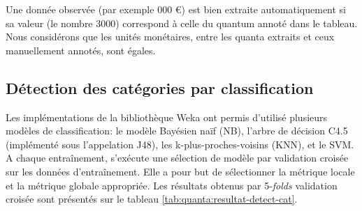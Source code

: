 Une donnée observée (par exemple  000 \euro \fg) est bien extraite automatiquement si sa valeur (le nombre $3000$) correspond à celle du quantum annoté dans le tableau. Nous considérons que les unités monétaires, entre les quanta extraits et ceux manuellement annotés, sont égales.




\subsection{Détection des catégories par classification}
Les implémentations de la bibliothèque Weka \citep{frank2016weka} ont permis d'utilisé plusieurs modèles de classification: le modèle Bayésien naïf (NB), l'arbre de décision C4.5 (implémenté sous l'appelation J48), les k-plus-proches-voisins (KNN), et le SVM. 
 A chaque entraînement, s'exécute une sélection de modèle par validation croisée sur les données d'entraînement. Elle a pour but de sélectionner la métrique locale et la métrique globale appropriée. Les résultats obtenus par 5-\textit{folds} validation croisée sont présentés sur le tableau \ref{tab:quanta:resultat-detect-cat}.  
 

